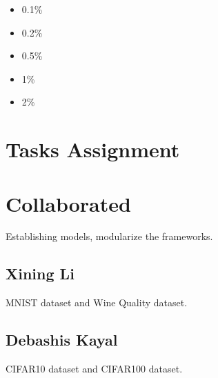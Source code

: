 \documentclass{article}
\begin{document}
\begin{itemize}
    \item 0.1\%
    \item 0.2\%
    \item 0.5\%
    \item 1\%
    \item 2\%
\end{itemize}


\section{Tasks Assignment}

\section{Collaborated}
Establishing models, modularize the frameworks.

\subsection{Xining Li}
MNIST dataset and Wine Quality dataset. 

\subsection{Debashis Kayal}
CIFAR10 dataset and CIFAR100 dataset. 
\end{document}
